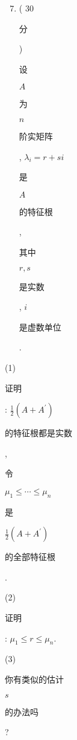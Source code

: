 \documentclass[10pt]{article}
\begin{document}
\begin{enumerate}
  \setcounter{enumi}{6}
  \item ( 30 \begin{CJK}{UTF8}{mj}分\end{CJK}) \begin{CJK}{UTF8}{mj}设\end{CJK} $A$ \begin{CJK}{UTF8}{mj}为\end{CJK} $n$ \begin{CJK}{UTF8}{mj}阶实矩阵\end{CJK}, $\lambda_{i}=r+s i$ \begin{CJK}{UTF8}{mj}是\end{CJK} $A$ \begin{CJK}{UTF8}{mj}的特征根\end{CJK}, \begin{CJK}{UTF8}{mj}其中\end{CJK} $r, s$ \begin{CJK}{UTF8}{mj}是实数\end{CJK}, $i$ \begin{CJK}{UTF8}{mj}是虚数单位\end{CJK}.
\end{enumerate}
(1) \begin{CJK}{UTF8}{mj}证明\end{CJK}: $\frac{1}{2}\left(A+A^{\prime}\right)$ \begin{CJK}{UTF8}{mj}的特征根都是实数\end{CJK}, \begin{CJK}{UTF8}{mj}令\end{CJK} $\mu_{1} \leqslant \cdots \leqslant \mu_{n}$ \begin{CJK}{UTF8}{mj}是\end{CJK} $\frac{1}{2}\left(A+A^{\prime}\right)$ \begin{CJK}{UTF8}{mj}的全部特征根\end{CJK}.

(2) \begin{CJK}{UTF8}{mj}证明\end{CJK}: $\mu_{1} \leqslant r \leqslant \mu_{n}$.

(3) \begin{CJK}{UTF8}{mj}你有类似的估计\end{CJK} $s$ \begin{CJK}{UTF8}{mj}的办法吗\end{CJK}?
\end{document}
